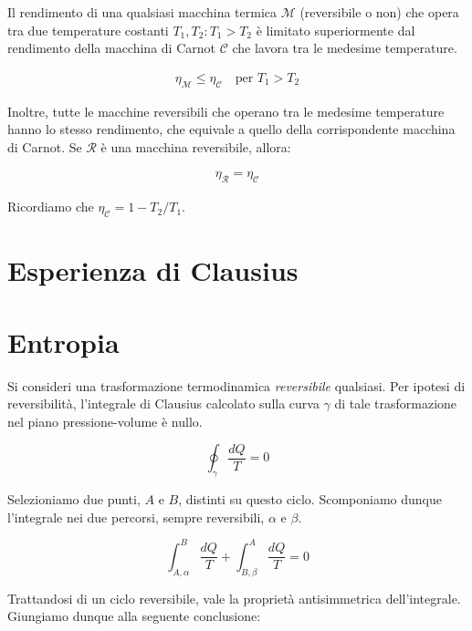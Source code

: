 \begin{tcolorbox}[colback = red!30, colframe = red!30!black, title = {Teorema di Carnot}]
Il rendimento di una qualsiasi macchina termica $\mathcal{M}$ (reversibile o non)
che opera tra due
temperature costanti $T_1,T_2: T_1 > T_2$ è limitato superiormente dal rendimento della
macchina di Carnot $\mathcal{C}$ che lavora tra le medesime temperature.

\begin{align}
    \eta_\mathcal{M} \leq \eta_\mathcal{C} \quad \text{per } T_1 > T_2\label{carnot1}
\end{align}

Inoltre, tutte le macchine reversibili che operano tra le medesime temperature
hanno lo stesso rendimento, che equivale a quello della corrispondente macchina di
Carnot. Se $\mathcal{R}$ è una macchina reversibile, allora:

\begin{align}
    \eta_\mathcal{R} = \eta_\mathcal{C}\label{carnot2}
\end{align}

\end{tcolorbox}

\noindent Ricordiamo che $\eta_\mathcal{C} = 1 - T_2 / T_1$.



\section{Esperienza di Clausius}

\section{Entropia}
Si consideri una trasformazione termodinamica \textit{reversibile} qualsiasi.
Per ipotesi di reversibilità, l'integrale di Clausius calcolato sulla curva $\gamma$
di tale trasformazione nel piano pressione-volume è nullo.

\[ \oint_\gamma \frac{dQ}{T} = 0 \]

\noindent Selezioniamo due punti, $A$ e $B$, distinti su questo ciclo. Scomponiamo
dunque l'integrale nei due percorsi, sempre reversibili, $\alpha$ e $\beta$.

\[ \int_{A,\alpha}^{B} \frac{dQ}{T} + \int_{B,\beta}^{A} \frac{dQ}{T} = 0 \]

\noindent Trattandosi di un ciclo reversibile, vale la proprietà antisimmetrica
dell'integrale. Giungiamo dunque alla seguente conclusione:


